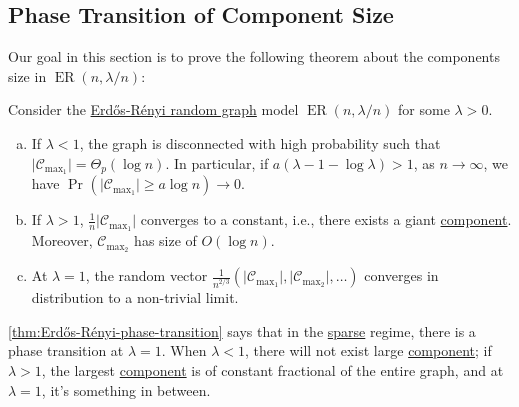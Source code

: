 \subsection{Phase Transition of Component Size}
Our goal in this section is to prove the following theorem about the components size in \(\operatorname{ER}(n, \lambda / n) \):

\begin{theorem}\label{thm:Erdős-Rényi-phase-transition}
	Consider the \hyperref[def:Erdős-Rényi-random-graph]{Erdős-Rényi random graph} model \(\operatorname{ER}(n, \lambda / n)\) for some \(\lambda > 0\).
	\begin{enumerate}[(a)]
		\item\label{thm:Erdős-Rényi-phase-transition-a} If \(\lambda < 1\), the graph is disconnected with high probability such that \(\lvert \mathcal{C} _{\max _1} \rvert = \Theta _p (\log n)\). In particular, if \(a (\lambda - 1 - \log \lambda ) > 1\), as \(n \to \infty \), we have \(\Pr_{}\left( \lvert \mathcal{C} _{\max _1} \rvert \geq  a \log n \right) \to 0\).
		\item\label{thm:Erdős-Rényi-phase-transition-b} If \(\lambda > 1\), \(\frac{1}{n} \lvert \mathcal{C} _{\max _1} \rvert \) converges to a constant, i.e., there exists a giant \hyperref[def:connected-component]{component}. Moreover, \(\mathcal{C} _{\max _2}\) has size of \(O(\log n)\).
		\item\label{thm:Erdős-Rényi-phase-transition-c} At \(\lambda = 1\), the random vector \(\frac{1}{n^{2 / 3}} (\lvert \mathcal{C} _{\max _1} \rvert , \lvert \mathcal{C} _{\max _2} \rvert , \dots )\) converges in distribution to a non-trivial limit.
	\end{enumerate}
\end{theorem}

\autoref{thm:Erdős-Rényi-phase-transition} says that in the \hyperref[def:sparse-graph]{sparse} regime, there is a phase transition at \(\lambda = 1\). When \(\lambda < 1\), there will not exist large \hyperref[def:connected-component]{component}; if \(\lambda > 1\), the largest \hyperref[def:connected-component]{component} is of constant fractional of the entire graph, and at \(\lambda = 1\), it's something in between.

